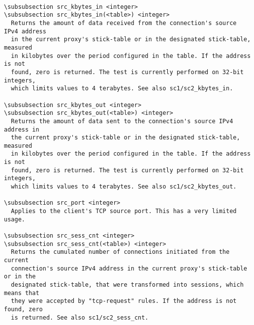\begin{verbatim}

\subsubsection src_kbytes_in <integer>
\subsubsection src_kbytes_in(<table>) <integer>
  Returns the amount of data received from the connection's source IPv4 address
  in the current proxy's stick-table or in the designated stick-table, measured
  in kilobytes over the period configured in the table. If the address is not
  found, zero is returned. The test is currently performed on 32-bit integers,
  which limits values to 4 terabytes. See also sc1/sc2_kbytes_in.

\subsubsection src_kbytes_out <integer>
\subsubsection src_kbytes_out(<table>) <integer>
  Returns the amount of data sent to the connection's source IPv4 address in
  the current proxy's stick-table or in the designated stick-table, measured
  in kilobytes over the period configured in the table. If the address is not
  found, zero is returned. The test is currently performed on 32-bit integers,
  which limits values to 4 terabytes. See also sc1/sc2_kbytes_out.

\subsubsection src_port <integer>
  Applies to the client's TCP source port. This has a very limited usage.

\subsubsection src_sess_cnt <integer>
\subsubsection src_sess_cnt(<table>) <integer>
  Returns the cumulated number of connections initiated from the current
  connection's source IPv4 address in the current proxy's stick-table or in the
  designated stick-table, that were transformed into sessions, which means that
  they were accepted by "tcp-request" rules. If the address is not found, zero
  is returned. See also sc1/sc2_sess_cnt.


\end{verbatim}
